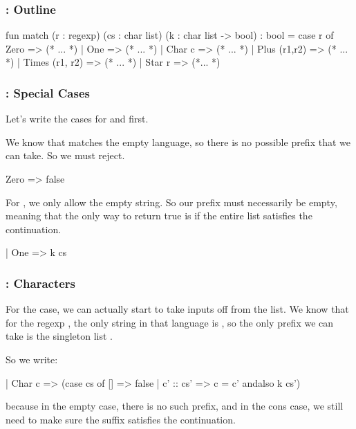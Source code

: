 \documentclass[aspectratio=169]{beamer}
\begin{document}
\begin{frame}[fragile]
  \frametitle{: Outline}

  \begin{codeblock}
    fun match (r : regexp) (cs : char list) (k : char list -> bool) : bool =
      case r of
        Zero => (* ... *) 
      | One => (* ... *) 
      | Char c => (* ... *) 
      | Plus (r1,r2) => (* ... *) 
      | Times (r1, r2) => (* ... *) 
      | Star r => (*... *)
  \end{codeblock}
\end{frame}

\begin{frame}[fragile]
  \frametitle{: Special Cases}

  Let's write the cases for  and  first.

  We know that  matches the empty language, so there is no possible
  prefix that we can take. So we must reject.

  \begin{codeblock}
    Zero => false
  \end{codeblock}

  For , we only allow the empty string. So our prefix must necessarily
  be empty, meaning that the only way to return true is if the entire list satisfies
  the continuation.

  \begin{codeblock}
    | One => k cs
  \end{codeblock}
\end{frame}

\begin{frame}[fragile]
  \frametitle{: Characters}

  For the  case, we can actually start to take inputs
  off from the list. We know that for the regexp , the only
  string in that language is , so the only prefix we can take is
  the singleton list .

  So we write:

  \begin{codeblock}
    | Char c => (case cs of
        [] => false
      | c' :: cs' => c = c' andalso k cs')
  \end{codeblock}

  because in the empty case, there is no such prefix, and in the cons case,
  we still need to make sure the suffix satisfies the continuation.
\end{frame}
\end{document}
